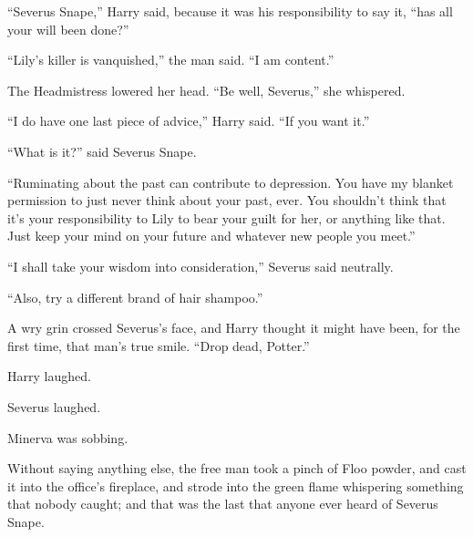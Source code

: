 “Severus Snape,” Harry said, because it was his responsibility to say it, “has all your will been done?”

“Lily’s killer is vanquished,” the man said. “I am content.”

The Headmistress lowered her head. “Be well, Severus,” she whispered.

“I do have one last piece of advice,” Harry said. “If you want it.”

“What is it?” said Severus Snape.

“Ruminating about the past can contribute to depression. You have my blanket permission to just never think about your past, ever. You shouldn’t think that it’s your responsibility to Lily to bear your guilt for her, or anything like that. Just keep your mind on your future and whatever new people you meet.”

“I shall take your wisdom into consideration,” Severus said neutrally.

“Also, try a different brand of hair shampoo.”

A wry grin crossed Severus’s face, and Harry thought it might have been, for the first time, that man’s true smile. “Drop dead, Potter.”

Harry laughed.

Severus laughed.

Minerva was sobbing.

Without saying anything else, the free man took a pinch of Floo powder, and cast it into the office’s fireplace, and strode into the green flame whispering something that nobody caught; and that was the last that anyone ever heard of Severus Snape.
